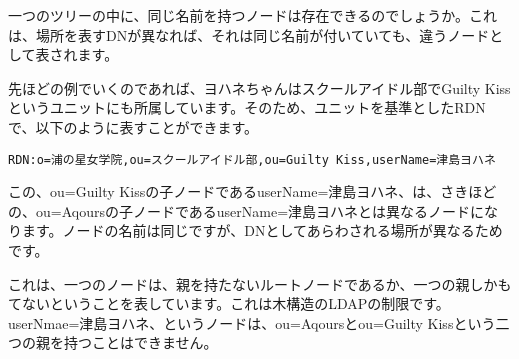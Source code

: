 一つのツリーの中に、同じ名前を持つノードは存在できるのでしょうか。これは、場所を表すDNが異なれば、それは同じ名前が付いていても、違うノードとして表されます。

先ほどの例でいくのであれば、ヨハネちゃんはスクールアイドル部でGuilty Kissというユニットにも所属しています。そのため、ユニットを基準としたRDNで、以下のように表すことができます。

\begin{verbatim}
RDN:o=浦の星女学院,ou=スクールアイドル部,ou=Guilty Kiss,userName=津島ヨハネ
\end{verbatim}

この、ou=Guilty Kissの子ノードであるuserName=津島ヨハネ、は、さきほどの、ou=Aqoursの子ノードであるuserName=津島ヨハネとは異なるノードになります。ノードの名前は同じですが、DNとしてあらわされる場所が異なるためです。

これは、一つのノードは、親を持たないルートノードであるか、一つの親しかもてないということを表しています。これは木構造のLDAPの制限です。userNmae=津島ヨハネ、というノードは、ou=Aqoursとou=Guilty Kissという二つの親を持つことはできません。

